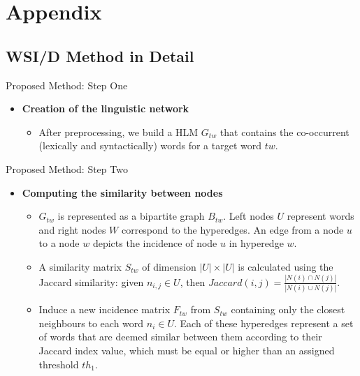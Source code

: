 	
\section{Appendix}

\subsection{WSI/D Method in Detail}

\begin{frame}{Proposed Method: Step One}

\begin{itemize}
	\item \textbf{Creation of the linguistic network}
	\begin{itemize}
		\item After preprocessing, we build a HLM $G_{tw}$ that contains the co-occurrent (lexically and syntactically) words for a target word $tw$.
	\end{itemize}

\end{itemize}


\end{frame}

\begin{frame}{Proposed Method: Step Two}
\begin{itemize}

\item \textbf{Computing the similarity between nodes}
	\begin{itemize}
		\item $G_{tw}$ is represented as a bipartite graph $B_{tw}$. Left nodes $U$ represent words and right nodes $W$ correspond to the hyperedges. An edge from a node $u$ to a node $w$ depicts the incidence of node $u$ in hyperedge $w$.
		
		\item A similarity matrix $S_{tw}$ of dimension $|U|\times|U|$ is calculated using the Jaccard similarity: given $n_{i,j} \in U$, then $Jaccard(i,j)=\frac{|N(i)\cap N(j)|}{|N(i)\cup N(j)|}$.
	
		
		\item Induce a new incidence matrix $F_{tw}$ from $S_{tw}$ containing only the closest neighbours to each word $n_i \in U$. Each of these hyperedges represent a set of words that are deemed similar between them according to their Jaccard index value, which must be equal or higher than an assigned threshold $th_1$.
		
	\end{itemize}


\end{itemize}

\end{frame}


